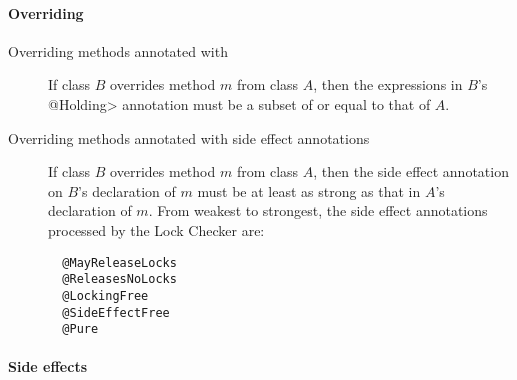 \paragraph{Overriding}

\begin{description}

\item[Overriding methods annotated with ]
  If class $B$ overrides method $m$ from class $A$, then the expressions in
  $B$'s \<@Holding>
  annotation must be a subset of or equal to that of $A$.

\item[Overriding methods annotated with side effect annotations]
  If class $B$ overrides method $m$ from class $A$, then
  the side effect annotation on $B$'s declaration of $m$
  must be at least as strong as that in $A$'s declaration of $m$.
  From weakest to strongest, the side effect annotations
  processed by the Lock Checker are:
\begin{verbatim}
  @MayReleaseLocks
  @ReleasesNoLocks
  @LockingFree
  @SideEffectFree
  @Pure
\end{verbatim}

\end{description}

\paragraph{Side effects}

